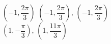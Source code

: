 { $\left( -1, \dfrac{2\pi}{3} \right)$}
{$\left( -1, \dfrac{2\pi}{3} \right), \, \left( -1, \dfrac{2\pi}{3} \right)$\\$\left( 1, -\dfrac{\pi}{3} \right), \, \left( 1, \dfrac{11\pi}{3} \right)$\\ }
